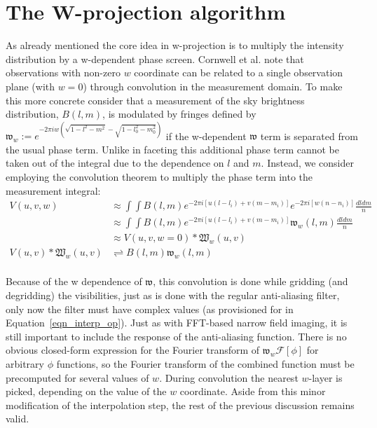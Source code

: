 \section{The W-projection algorithm}
As already mentioned the core idea in w-projection is to multiply the intensity distribution by a w-dependent phase screen. Cornwell et al. \cite{cornwell2008noncoplanar}
note that observations with non-zero $w$ coordinate can be related to a single observation plane (with $w=0$) through convolution in the measurement domain. To make this
more concrete consider that a measurement of the sky brightness distribution, $B(l,m)$, is modulated by fringes defined by $\mathfrak{w}_w := e^{-2\pi i w(\sqrt{1-l^2-m^2}-\sqrt{1-l_0^2-m_0^2})}$ if the 
w-dependent $\mathfrak{w}$ term is separated from the usual phase term. Unlike in faceting this additional phase term cannot be taken out of the integral due to the dependence on $l$ and $m$. Instead,
we consider employing the convolution theorem to multiply the phase term into the measurement integral:
\begin{equation}
 \begin{split}
        V(u,v,w)&\approx\int{\int{B(l,m)e^{-2{\pi}i[u(l-l_i)+v(m-m_i)]}e^{-2{\pi}i[w(n-n_i)]}\frac{dldm}{n}}}\\
		&\approx\int{\int{B(l,m)e^{-2{\pi}i[u(l-l_i)+v(m-m_i)]}\mathfrak{w}_w(l,m)\frac{dldm}{n}}}\\
		&\approx V(u,v,w=0)*\mathfrak{W}_w(u,v)\\
	V(u,v) * \mathfrak{W}_w(u,v) &\rightleftharpoons B(l,m)\mathfrak{w}_w(l,m)\\
 \end{split}
\end{equation}

Because of the w dependence of $\mathfrak{w}$, this convolution is done while gridding (and degridding) the visibilities, just as is done with the regular 
anti-aliasing filter, only now the filter must have complex values (as provisioned for in Equation~\ref{eqn_interp_op}). Just as with FFT-based narrow 
field imaging, it is still important to include the response of the anti-aliasing function. There is no obvious closed-form expression for the 
Fourier transform of $\mathfrak{w}_w\mathcal{F}[\phi]$ for arbitrary $\phi$ functions, so the Fourier transform of the combined function must be precomputed 
for several values of $w$. During convolution the nearest $w$-layer is picked, depending on the value of the $w$ coordinate. Aside from this minor modification 
of the interpolation step, the rest of the previous discussion remains valid.

